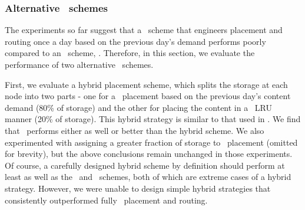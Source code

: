 \subsubsection{Alternative \planned\  schemes}
\label{sec:hybrid}

The experiments so far  suggest that a \planned\ scheme that engineers placement and routing once a day based on the previous day's demand performs poorly compared to an \unplanned\ scheme, \invlru. Therefore, in this section, we evaluate the performance of two alternative \planned\ schemes. 



First, we evaluate a hybrid placement scheme, which splits the storage at each node into two parts - one for a \planned\ placement based on the previous day's content demand (80\% of storage) and the other for placing the content in a \unplanned\ LRU manner (20\% of storage). This hybrid strategy is similar to that used in \cite{Applegate2010}. We find that \invlru\ performs either as well or better than the hybrid scheme.  We also experimented with assigning a greater fraction of storage to \unplanned\ placement (omitted for brevity), but the above conclusions remain unchanged in those experiments. Of course, a carefully designed hybrid scheme by definition should perform at least as well as the \unplanned\ and \planned\ schemes, both of which are extreme cases of a hybrid strategy. However, we were unable to design simple hybrid strategies that consistently outperformed fully \unplanned\ placement and routing.

